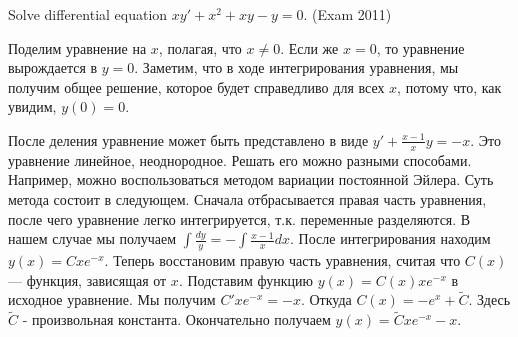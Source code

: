 \begin{problem}
Solve differential equation $xy'+x^{2} +xy-y=0$. (Exam 2011)


\begin{sol}
Поделим уравнение на $x$, полагая, что $x\neq 0$. Если же $x=0$, то уравнение вырождается в $y=0$. Заметим, что в ходе интегрирования уравнения, мы получим общее решение, которое будет справедливо для всех $x$, потому что, как увидим, $y(0)=0$.

После деления уравнение может быть представлено в виде $y'+\frac{x-1}{x} y=-x$. Это уравнение линейное, неоднородное. Решать его можно разными способами. Например, можно воспользоваться методом вариации постоянной Эйлера. Суть метода состоит в следующем. Сначала отбрасывается правая часть уравнения, после чего уравнение легко интегрируется, т.к. переменные разделяются. В нашем случае мы получаем $\int \frac{dy}{y} =-\int \frac{x-1}{x} dx  $. После интегрирования находим $y(x)=Cxe^{-x} $. Теперь восстановим правую часть уравнения, считая что $C(x)$ --- функция, зависящая от $x$. Подставим функцию $y(x)=C(x)xe^{-x} $ в исходное уравнение. Мы получим $C'xe^{-x} =-x$. Откуда $C(x)=-e^{x} +\tilde{C}$. Здесь $\tilde{C}$ - произвольная константа. Окончательно получаем $y(x)=\tilde{C}xe^{-x} -x$.
\end{sol}
\end{problem}


